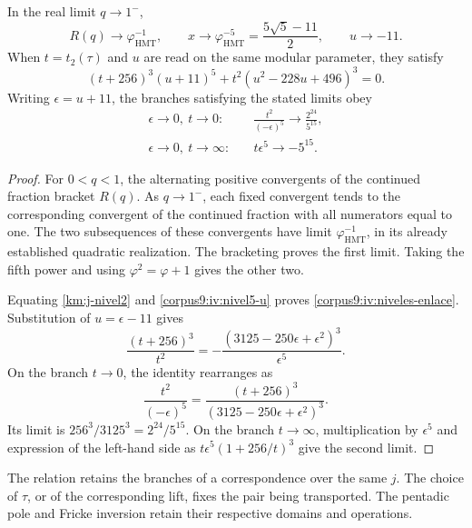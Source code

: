 \begin{proposition}
\label{corpus9:iv:niveles-ramas}
In the real limit \(q\to1^-\),
\[
 R(q)\longrightarrow\varphi_{\mathrm{HMT}}^{-1},\qquad
 x\longrightarrow\varphi_{\mathrm{HMT}}^{-5}
     =\frac{5\sqrt5-11}{2},\qquad u\longrightarrow-11.
\]
When \(t=t_2(\tau)\) and \(u\) are read on the same modular
parameter, they satisfy
\begin{equation}
 (t+256)^3(u+11)^5
   +t^2(u^2-228u+496)^3=0.
 \label{corpus9:iv:niveles-enlace}
\end{equation}
Writing \(\epsilon=u+11\), the branches satisfying the stated
limits obey
\begin{align}
 \epsilon\to0,\ t\to0:
 &\quad \frac{t^2}{(-\epsilon)^5}\longrightarrow
          \frac{2^{24}}{5^{15}},\\
 \epsilon\to0,\ t\to\infty:
 &\quad t\epsilon^5\longrightarrow-5^{15}.
 \label{corpus9:iv:niveles-asintotica}
\end{align}
\end{proposition}
\begin{proof}
For \(0<q<1\), the alternating positive convergents of the
continued fraction bracket \(R(q)\). As \(q\to1^-\), each
fixed convergent tends to the corresponding convergent of
the continued fraction with all numerators equal to one.
The two subsequences of these convergents have limit
\(\varphi_{\mathrm{HMT}}^{-1}\), in its already established
quadratic realization. The bracketing proves the first limit.
Taking the fifth power and using \(\varphi^2=\varphi+1\)
gives the other two.

Equating \eqref{km:j-nivel2} and \eqref{corpus9:iv:nivel5-u}
proves \eqref{corpus9:iv:niveles-enlace}. Substitution of
\(u=\epsilon-11\) gives
\[
 \frac{(t+256)^3}{t^2}
   =-\frac{(3125-250\epsilon+\epsilon^2)^3}{\epsilon^5}.
\]
On the branch \(t\to0\), the identity rearranges as
\[
 \frac{t^2}{(-\epsilon)^5}
   =\frac{(t+256)^3}{(3125-250\epsilon+\epsilon^2)^3}.
\]
Its limit is \(256^3/3125^3=2^{24}/5^{15}\).
On the branch \(t\to\infty\), multiplication by \(\epsilon^5\)
and expression of the left-hand side as
\(t\epsilon^5(1+256/t)^3\) give the second limit.
\end{proof}

The relation retains the branches of a correspondence over the
same \(j\). The choice of \(\tau\), or of the corresponding
lift, fixes the pair being transported. The pentadic pole
and Fricke inversion retain their respective domains and
operations.

